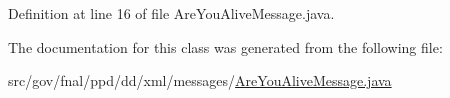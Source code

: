 Definition at line 16 of file Are\-You\-Alive\-Message.\-java.



The documentation for this class was generated from the following file\-:\begin{DoxyCompactItemize}
\item 
src/gov/fnal/ppd/dd/xml/messages/\hyperlink{AreYouAliveMessage_8java}{Are\-You\-Alive\-Message.\-java}\end{DoxyCompactItemize}
